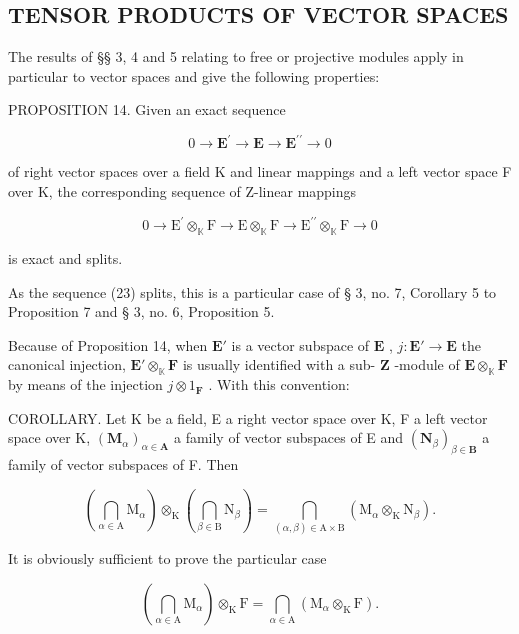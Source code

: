 \subsection{TENSOR PRODUCTS OF VECTOR SPACES}

The results of §§ 3, 4 and 5 relating to free or projective modules apply in particular to vector spaces and give the following properties:

PROPOSITION 14. Given an exact sequence

\[
0 \rightarrow \mathbf {E} ^ {\prime} \rightarrow \mathbf {E} \rightarrow \mathbf {E} ^ {\prime \prime} \rightarrow 0\tag{23}
\]

of right vector spaces over a field K and linear mappings and a left vector space F over K, the corresponding sequence of Z-linear mappings

\[
0 \rightarrow \mathrm{E} ^ {\prime} \otimes_ {\mathbb {K}} \mathrm{F} \rightarrow \mathrm{E} \otimes_ {\mathbb {K}} \mathrm{F} \rightarrow \mathrm{E} ^ {\prime \prime} \otimes_ {\mathbb {K}} \mathrm{F} \rightarrow 0
\]

is exact and splits.

As the sequence (23) splits, this is a particular case of § 3, no. 7, Corollary 5 to Proposition 7 and § 3, no. 6, Proposition 5.

Because of Proposition 14, when \(\mathbf{E}'\) is a vector subspace of \(\mathbf{E}\) , \(j: \mathbf{E}' \to \mathbf{E}\) the canonical injection, \(\mathbf{E}' \otimes_{\mathbb{K}} \mathbf{F}\) is usually identified with a sub- \(\mathbf{Z}\) -module of \(\mathbf{E} \otimes_{\mathbb{K}} \mathbf{F}\) by means of the injection \(j \otimes 1_{\mathbf{F}}\) . With this convention:

COROLLARY. Let K be a field, E a right vector space over K, F a left vector space over K, \((\mathbf{M}_{\alpha})_{\alpha \in \mathbf{A}}\) a family of vector subspaces of E and \((\mathbf{N}_{\beta})_{\beta \in \mathbf{B}}\) a family of vector subspaces of F. Then

\[
\left(\bigcap_ {\alpha \in \mathrm{A}} \mathrm{M} _ {\alpha}\right) \otimes_ {\mathrm{K}} \left(\bigcap_ {\beta \in \mathrm{B}} \mathrm{N} _ {\beta}\right) = \bigcap_ {(\alpha , \beta) \in \mathrm{A} \times \mathrm{B}} \left(\mathrm{M} _ {\alpha} \otimes_ {\mathrm{K}} \mathrm{N} _ {\beta}\right).\tag{24}
\]

It is obviously sufficient to prove the particular case

\[
\left(\bigcap_ {\alpha \in \mathrm{A}} \mathrm{M} _ {\alpha}\right) \otimes_ {\mathrm{K}} \mathrm{F} = \bigcap_ {\alpha \in \mathrm{A}} \left(\mathrm{M} _ {\alpha} \otimes_ {\mathrm{K}} \mathrm{F}\right).\tag{25}
\]

